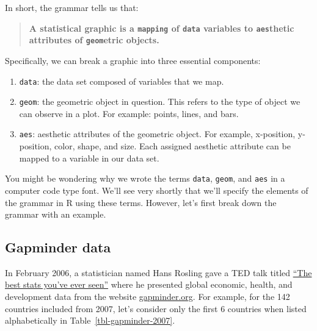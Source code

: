 \documentclass[
  letterpaper,
  DIV=11,
  numbers=noendperiod]{scrreprt}
\providecommand{\tightlist}{%
  \setlength{\itemsep}{0pt}\setlength{\parskip}{0pt}}\usepackage{longtable,booktabs,array}
\theoremstyle{definition}
\theoremstyle{remark}
\begin{document}
In short, the grammar tells us that:

\begin{quote}
\textbf{A statistical graphic is a \texttt{mapping} of \texttt{data}
variables to \texttt{aes}thetic attributes of \texttt{geom}etric
objects.}
\end{quote}

Specifically, we can break a graphic into three essential components:

\begin{enumerate}
\def\labelenumi{\arabic{enumi}.}
\tightlist
\item
  \texttt{data}: the data set composed of variables that we map.
\item
  \texttt{geom}: the geometric object in question. This refers to the
  type of object we can observe in a plot. For example: points, lines,
  and bars.
\item
  \texttt{aes}: aesthetic attributes of the geometric object. For
  example, x-position, y-position, color, shape, and size. Each assigned
  aesthetic attribute can be mapped to a variable in our data set.
\end{enumerate}

You might be wondering why we wrote the terms \texttt{data},
\texttt{geom}, and \texttt{aes} in a computer code type font. We'll see
very shortly that we'll specify the elements of the grammar in R using
these terms. However, let's first break down the grammar with an
example.

\hypertarget{sec-gapminder}{%
\subsection{Gapminder data}\label{sec-gapminder}}

In February 2006, a statistician named Hans Rosling gave a TED talk
titled
\href{https://www.ted.com/talks/hans_rosling_shows_the_best_stats_you_ve_ever_seen}{``The
best stats you've ever seen''} where he presented global economic,
health, and development data from the website
\href{http://www.gapminder.org/tools/\#_locale_id=en;\&chart-type=bubbles}{gapminder.org}.
For example, for the 142 countries included from 2007, let's consider
only the first 6 countries when listed alphabetically in
Table~\ref{tbl-gapminder-2007}.
\end{document}
